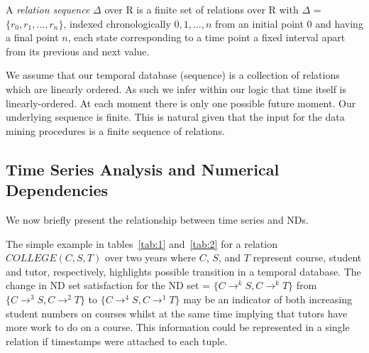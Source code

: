 \begin{definition}
\begin{rm}
A {\em relation sequence} $\Delta$ over R is a finite set of
relations over R with $\Delta$ = $\{ r_0, r_1, \ldots, r_n \}$,
indexed chronologically $0, 1, \ldots, n$ from an initial point 0 and
having a final point $n$, each state corresponding to a time point a
fixed interval apart from its previous and next value.
\end{rm}
\end{definition}

We assume that our temporal database (sequence) is a collection of
relations which are linearly ordered. As such we infer within our
logic that time itself is linearly-ordered. At each moment there is
only one possible future moment. 
Our underlying sequence is finite. This is natural given that the
input for the
data mining procedures is a finite sequence of relations.


\subsection{Time Series Analysis and Numerical
Dependencies}\label{subsec:tl_tsa_nd}

We now briefly present the relationship between time series and NDs.

\smallskip

The simple example in tables~\ref{tab:1} and~\ref{tab:2} for
a relation $COLLEGE(C,S,T)$ over two years where $C$, $S$, and $T$
represent course, student and tutor, respectively, highlights possible
transition in a temporal database. The change in ND set satisfaction
for the ND set = $\{ C \to^k S, C \to^k T \}$ from $\{ C \to^3 S, C \to^2 T \}$
to $\{ C \to^4 S, C \to^1 T \}$ may be an indicator of both increasing
student numbers on courses whilst at the same time implying that
tutors have more work to do on a course. This information could be
represented in a single relation if timestamps were attached to each
tuple.

